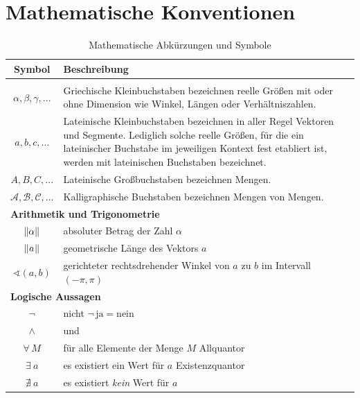 \documentclass[../main/thesis.tex]{subfiles}
\begin{document}
\chapter{Mathematische Konventionen}
\label{appx:mathsymbols}

{\setlength{\doublerulesep}{1mm}%
\begin{longtable}[c]{|c|p{12cm}|}
\hline
\textbf{Symbol} & \textbf{Beschreibung} \\
\hline
\hline
\endhead
\caption*{(fortgesetzt)}
\endfoot
\caption{Mathematische Abkürzungen und Symbole}
\endlastfoot
\multicolumn{2}{|l|}{\textbf{Bezeichner}} \\
\hline
$\alpha,\beta,\gamma,...$ & Griechische Kleinbuchstaben bezeichnen reelle Größen mit oder ohne Dimension wie Winkel, Längen oder Verhältniszahlen. \\
\hline
$a,b,c,...$ & Lateinische Kleinbuchstaben bezeichnen in aller Regel Vektoren und Segmente. Lediglich solche reelle Größen, für die ein lateinischer Buchstabe im jeweiligen Kontext fest etabliert ist, werden mit lateinischen Buchstaben bezeichnet. \\
\hline
$A,B,C,...$ & Lateinische Großbuchstaben bezeichnen Mengen. \\
\hline
$\mathcal{A},\mathcal{B},\mathcal{C},...$ & Kalligraphische Buchstaben bezeichnen Mengen von Mengen. \\
\hline
\hline
\multicolumn{2}{|l|}{\textbf{Arithmetik und Trigonometrie}} \\
\hline
$\abs[\alpha]$ & absoluter Betrag der Zahl $\alpha$ \\  %
\hline
$\abs[\mathtowidth[\alpha]{a}]$ & geometrische Länge des Vektors $a$ \\  %
\hline
$\sphericalangle(a,b)$ & gerichteter rechtsdrehender Winkel von $a$ zu $b$ im Intervall $(-\pi,\pi)$ \\
\hline
\hline
\multicolumn{2}{|l|}{\textbf{Logische Aussagen}} \\
\hline
$\neg$ & nicht \hfill $\neg\,\text{ja} = \text{nein}$ \\
\hline
$\wedge$ & und \\
\hline
$\forall\, M$ & für alle Elemente der Menge $M$ \hfill Allquantor \\
\hline
$\exists\ a$ & es existiert ein Wert für $a$ \hfill Existenzquantor \\
\hline
$\nexists\ a$ & es existiert \emph{kein} Wert für $a$ \\

\end{longtable}}
\end{document}
